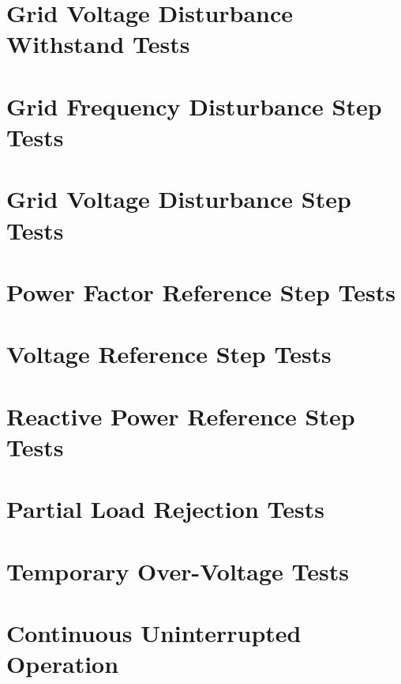 \documentclass{../grid-link-report}
\begin{document}
	\section{Grid Voltage Disturbance Withstand Tests}
	\label{Grid Voltage Disturbance Withstand Tests}
	
	\section{Grid Frequency Disturbance Step Tests}
	\label{Grid Frequency Disturbance Step Tests}
	
	\section{Grid Voltage Disturbance Step Tests}
	\label{Grid Voltage Disturbance Step Tests}
	
	\section{Power Factor Reference Step Tests}
	\label{Power Factor Reference Step Tests}
	
	\section{Voltage Reference Step Tests}
	\label{Voltage Reference Step Tests}
	
	\section{Reactive Power Reference Step Tests}
	\label{Reactive Power Reference Step Tests}

	\section{Partial Load Rejection Tests}
	\label{Partial Load Rejection Tests}
	
	\section{Temporary Over-Voltage Tests}
	\label{Temporary Over-Voltage Tests}
	
	\section{Continuous Uninterrupted Operation}
	\label{Continuous Uninterrupted Operation}
	
\end{document}
